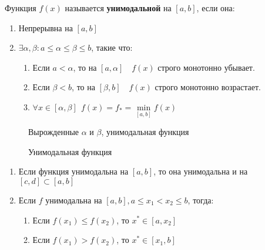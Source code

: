 \documentclass[12pt, a4paper, oneside]{book}
\begin{document}
\begin{definition}
    Функция \(f(x)\) называется \textbf{унимодальной} на \([a, b]\), если она:
    \begin{enumerate}
        \item Непрерывна на \([a, b]\)
        \item \(\exists \alpha, \beta : a \leq \alpha \leq \beta \leq b\), такие что:
              \begin{enumerate}
                  \item Если \(a < \alpha\), то на \([a, \alpha] \quad f(x)\) строго монотонно убывает.
                  \item Если \(\beta < b\), то на \([\beta, b] \quad f(x)\) строго монотонно возрастает.
                  \item \(\forall x\in [\alpha, \beta] \ \ f(x) = f_* = \min\limits_{[a, b]} f(x)\)
              \end{enumerate}
    \end{enumerate}
\end{definition}

\begin{figure}[h]
    \centering
    \begin{minipage}{0.5\textwidth}
        \centering
        
        \caption{Вырожденные \(\alpha\) и \(\beta\), унимодальная функция}
    \end{minipage}%
    \begin{minipage}{0.5\textwidth}
        \centering
        
        \caption{Унимодальная функция}
    \end{minipage}
\end{figure}

\begin{prop}\itemfix
    \begin{enumerate}
        \item Если функция унимодальна на \([a, b]\), то она унимодальна и на \([c, d] \subset [a, b]\)
        \item Если \(f\) унимодальна на \([a, b], a \leq x_1 < x_2 \leq b\), тогда:
              \begin{enumerate}
                  \item Если \(f(x_1) \leq f(x_2)\), то \(x^*\in [a, x_2]\)
                  \item Если \(f(x_1) > f(x_2)\), то \(x^*\in[x_1, b]\)
              \end{enumerate}
    \end{enumerate}
\end{prop}
\end{document}
